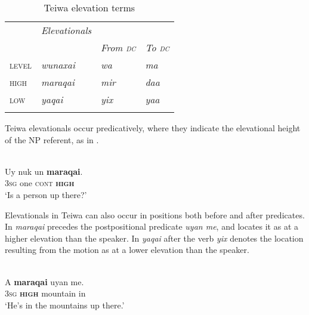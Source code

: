  



\begin{table}\centering
\begin{tabularx}{\textwidth}{X>{\it}X>{\it}X>{\it}l}
\lsptoprule
 & \rm Elevationals & \multicolumn{2}{c}{\rm Elevational\ist{elevation} motion\is{motion} verb}\\
 &  & \rm From \textsc{dc} & \rm To \textsc{dc}\\
\midrule
{\scshape level} & {wunaxai} & {wa} & ma\\
{\scshape high} & {maraqai} & {mir} & daa\\
{\scshape low} & {yaqai} & {yix} & yaa\\
\lspbottomrule
\end{tabularx}

\caption{Teiwa elevation terms}
\label{tab:7:teiwa}
\end{table}

Teiwa elevationals occur predicatively, where they indicate the elevational height of the NP referent, as in . 

 

\ea%
\label{ex:7:6}
 \\
\gll  Uy  nuk   un  \textbf{maraqai}. \\
       \textsc{3sg} one  \textsc{cont} \textbf{\textsc{high}} \\
\glt `Is a person up there?'
\z



 

 

Elevationals in Teiwa can also occur in positions both before and after predicates. In  \textit{maraqai} precedes the postpositional predicate \textit{uyan me{\textglotstop}}, and locates it as at a higher elevation than the speaker. In  \textit{yaqai} after the verb \textit{yix} denotes the location resulting from the motion as at a lower elevation than the speaker.



\ea%
\label{ex:7:7}
 \\
\gll A  \textbf{{maraqai}} {uyan}  me{\textglotstop}{.} \\
      \textsc{3sg} \textbf{\textsc{high}} mountain  in    \\
\glt `He's in the mountains up there.'  
\z

